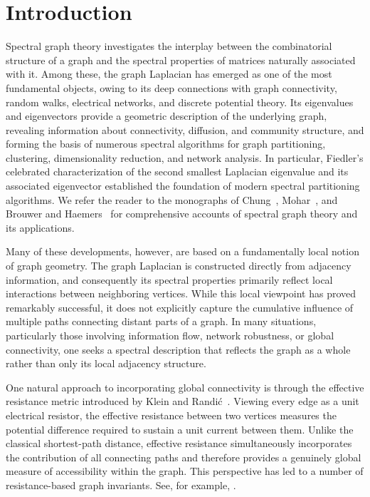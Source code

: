 \documentclass[12pt,a4paper]{amsart}
\theoremstyle{remark}
\theoremstyle{definition}
\newcommand{\1}{\mathbf{1}}
\newcommand{\0}{\mathbf{0}}
\begin{document}
\section{Introduction}
Spectral graph theory investigates the interplay between the combinatorial structure of a graph and the spectral properties of matrices naturally associated with it.
Among these, the graph Laplacian has emerged as one of the most fundamental objects, owing to its deep connections with graph connectivity, random walks, electrical networks, and discrete potential theory. 
Its eigenvalues and eigenvectors provide a geometric description of the underlying graph, revealing information about connectivity, diffusion, and community structure, and forming the basis of numerous spectral algorithms for graph partitioning, clustering, dimensionality reduction, and network analysis.
In particular, Fiedler's celebrated characterization of the second smallest Laplacian eigenvalue and its associated eigenvector established the foundation of modern spectral partitioning algorithms. We refer the reader to the monographs of Chung~\cite{Chung1997}, Mohar~\cite{Mohar1991}, and Brouwer and Haemers~\cite{brouwer2011spectra} for comprehensive accounts of spectral graph theory and its applications.


Many of these developments, however, are based on a fundamentally local notion of graph geometry. The graph Laplacian is constructed directly from adjacency information, and consequently its spectral properties primarily reflect local interactions between neighboring vertices. 
While this local viewpoint has proved remarkably successful, it does not explicitly capture the cumulative influence of multiple paths connecting distant parts of a graph. 
In many situations, particularly those involving information flow, network robustness, or global connectivity, one seeks a spectral description that reflects the graph as a whole rather than only its local adjacency structure.

One natural approach to incorporating global connectivity is through the effective resistance metric introduced by Klein and Randi\'c~\cite{Klein}. Viewing every edge as a unit electrical resistor, the effective resistance between two vertices measures the potential difference required to sustain a unit current between them. Unlike the classical shortest-path distance, effective resistance simultaneously incorporates the contribution of all connecting paths and therefore provides a genuinely global measure of accessibility within the graph. 
This perspective has led to a number of resistance-based graph invariants. 
See, for example, \cite{Bapat2010, bapat2014, parab2024}.
\end{document}
